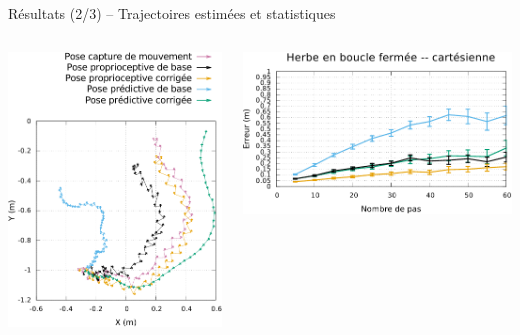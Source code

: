 \begin{frame}{Résultats (2/3) -- Trajectoires estimées et statistiques}
    \begin{columns}
        \begin{column}{0.5\linewidth}
            \centering
            \includegraphics[type=pdf,ext=.pdf,read=.pdf,width=1.0\linewidth]{../plot/OdometryLWPR/grass_open_traj2_pose}
        \end{column}
        \begin{column}{0.5\linewidth}
            \centering
            \includegraphics[type=pdf,ext=.pdf,read=.pdf,width=1.0\linewidth]{../plot/OdometryLWPR/grass_close_compare_cart}

\end{column}
\end{columns}
\end{frame}
